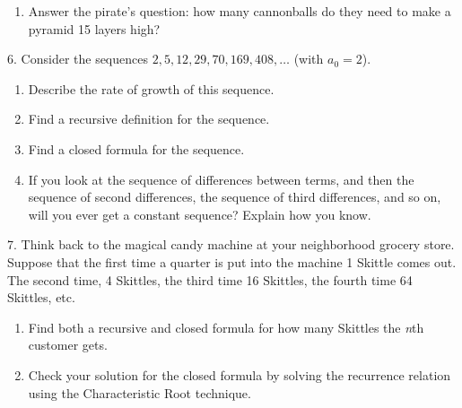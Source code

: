 \documentclass[10pt,]{book}
\theoremstyle{plain}
\theoremstyle{definition}
\theoremstyle{definition}
\theoremstyle{definition}
\numberwithin{equation}{chapter}
\begin{document}
\begin{exerciselist}
\begin{enumerate}[label=(\alph*)]
\item\hypertarget{li-1030}{}
                Answer the pirate's question: how many cannonballs do they need to make a pyramid 15 layers high?



\end{enumerate}
\par\smallskip
\item[6.]\hypertarget{exercise-210}{}
            Consider the sequences \(2, 5, 12, 29, 70, 169, 408,\ldots\) (with \(a_0 = 2\)).
\leavevmode%
\begin{enumerate}[label=(\alph*)]
\item\hypertarget{li-1031}{}
                Describe the rate of growth of this sequence.


\item\hypertarget{li-1032}{}
                Find a recursive definition for the sequence.


\item\hypertarget{li-1033}{}
                Find a closed formula for the sequence.



\item\hypertarget{li-1034}{}
                If you look at the sequence of differences between terms, and then the sequence of second differences, the sequence of third differences, and so on, will you ever get a constant sequence? Explain how you know.


\end{enumerate}
\par\smallskip
\item[7.]\hypertarget{exercise-211}{}
            Think back to the magical candy machine at your neighborhood grocery store. Suppose that the first time a quarter is put into the machine 1 Skittle comes out. The second time, 4 Skittles, the third time 16 Skittles, the fourth time 64 Skittles, etc.
            \leavevmode%
\begin{enumerate}[label=(\alph*)]
\item\hypertarget{li-1035}{}
                  Find both a recursive and closed formula for how many Skittles the \emph{n}th customer gets.
\item\hypertarget{li-1036}{}
                  Check your solution for the closed formula by solving the recurrence relation using the Characteristic Root technique.
\end{enumerate}


\end{exerciselist}
\end{document}
